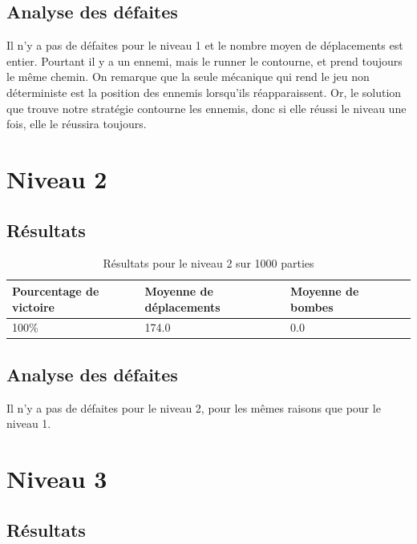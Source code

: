 \subsection{Analyse des défaites}

Il n'y a pas de défaites pour le niveau 1 et le nombre moyen de déplacements est entier.
Pourtant il y a un ennemi, mais le runner le contourne, et prend toujours le même chemin.
\newline
On remarque que la seule mécanique qui rend le jeu non déterministe est la position des ennemis lorsqu'ils réapparaissent.
Or, le solution que trouve notre stratégie contourne les ennemis, donc si elle réussi le niveau une fois, elle le réussira toujours.

\section{Niveau 2}

\subsection{Résultats}

\begin{table}[!htpb]
    \begin{tabularx}{\textwidth}{lXXX}
        \toprule
        Pourcentage de victoire & Moyenne de déplacements & Moyenne de bombes \\
        \midrule
        100\% & 174.0 & 0.0 \\
        \bottomrule
    \end{tabularx}
    \caption{Résultats pour le niveau 2 sur 1000 parties}
    \label{tab:res-niveau-2}
\end{table}

\subsection{Analyse des défaites}

Il n'y a pas de défaites pour le niveau 2, pour les mêmes raisons que pour le niveau 1.

\section{Niveau 3}

\subsection{Résultats}

